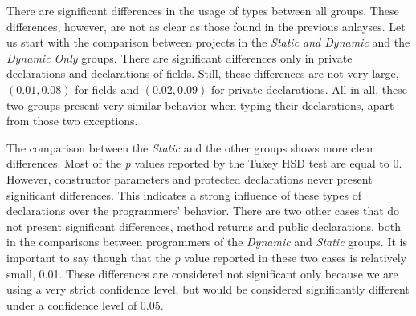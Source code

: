 \documentclass[msc]{ppgccufmg}
\begin{document}
There are significant differences in the usage of types between all groups.
These differences, however, are not as clear as those found in the previous anlayses.
Let us start with the comparison between projects in the \emph{Static and Dynamic} and the \emph{Dynamic Only} groups.
There are significant differences only in private declarations and declarations of fields.
Still, these differences are not very large, $(0.01,0.08)$ for fields and $(0.02,0.09)$ for private declarations.
All in all, these two groups present very similar behavior when typing their declarations, apart from those two exceptions.
                

The comparison between the \emph{Static} and the other groups shows more clear differences.
Most of the \emph{p} values reported by the Tukey HSD test are equal to 0.
However, constructor parameters and protected declarations never present significant differences.
This indicates a strong influence of these types of declarations over the programmers' behavior.
There are two other cases that do not present significant differences, method returns and public declarations, both in the comparisons between programmers of the \emph{Dynamic} and \emph{Static} groups.
It is important to say though that the \emph{p} value reported in these two cases is relatively small, 0.01.
These differences are considered not significant only because we are using a very strict confidence level, but would be considered significantly different under a confidence level of 0.05.
\end{document}
